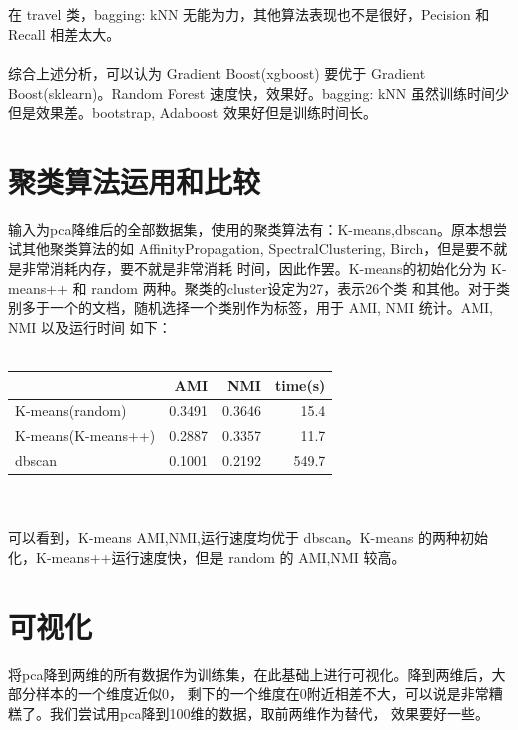 \documentclass[12pt]{article}
\begin{document}
\\
\\
在 travel 类，bagging: kNN 无能为力，其他算法表现也不是很好，Pecision 和 Recall 相差太大。
\\
\\
综合上述分析，可以认为 Gradient Boost(xgboost) 要优于 Gradient Boost(sklearn)。Random Forest
速度快，效果好。bagging: kNN 虽然训练时间少但是效果差。bootstrap, Adaboost 效果好但是训练时间长。

\section{聚类算法运用和比较}
输入为pca降维后的全部数据集，使用的聚类算法有：K-means,dbscan。原本想尝试其他聚类算法的如
AffinityPropagation, SpectralClustering, Birch，但是要不就是非常消耗内存，要不就是非常消耗
时间，因此作罢。K-means的初始化分为 K-means++ 和 random 两种。聚类的cluster设定为27，表示26个类
和其他。对于类别多于一个的文档，随机选择一个类别作为标签，用于 AMI, NMI 统计。AMI, NMI 以及运行时间
如下：\\
\\
\begin{tabular}{l|r|r|r}
  \hline
  &AMI&NMI&time(s)\\
  \hline
  K-means(random)& 0.3491&0.3646&15.4\\
  \hline
  K-means(K-means++)&0.2887&0.3357&11.7\\
  \hline
  dbscan&0.1001&0.2192&549.7\\
  \hline
\end{tabular}
\\
\\
可以看到，K-means AMI,NMI,运行速度均优于 dbscan。K-means 的两种初始化，K-means++运行速度快，但是
random 的 AMI,NMI 较高。

\section{可视化}
将pca降到两维的所有数据作为训练集，在此基础上进行可视化。降到两维后，大部分样本的一个维度近似0，
剩下的一个维度在0附近相差不大，可以说是非常糟糕了。我们尝试用pca降到100维的数据，取前两维作为替代，
效果要好一些。
\end{document}
